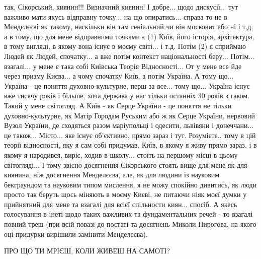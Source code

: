  так, Сікорський, киянин!!! Визначний киянин! І добре... щодо дискусії... тут
важливо мати якусь відправну точку... на що опиратись... справа то не в
Мєндєлєєві як такому, наскільки він там геніальний чи він московит або ні і
т.д, а в тому, що для мене відправними точками є (1) Київ, його історія,
архітектура, в тому вигляді, в якому вона існує в моєму світі... і т.д. Потім
(2) я сприймаю Людей як Людей, спочатку... а вже потім контекст національності
беру... Потім... взагалі... у мене є така собі Київська Теорія Відносності...
От у мене все йде через призму Києва... а чому спочатку Київ, а потім Україна.
А тому що... Україна - це поняття духовно-культурне, перш за все... тому що...
Україна існує вже тисячу років і більше, хоча держава у нас тільки останніх 30
років з гаком. Такий у мене світогляд. А Київ - як Серце України - це поняття
не тільки духовно-культурне, як Матір Городам Руським або ж як Серце України,
нервовий Вузол України, де сходяться разом маріупольці і одесити, львівяни і
донеччани... це також... Місто... яке існує об'єктивно, прямо зараз і тут.
Розумієте.. тому в цій теорії відносності, яку я сам собі придумав, Київ, в
якому я живу прямо зараз, і в якому я народився, виріс, ходив в школу... стоїть
на першому місці в цьому світогляді... І тому звісно досягнення Сікорського
стоять вище для мене як для киянина, ніж досягнення Менделєєва, але, як для
людини із науковим бекграундом та науковим типом мислення, я не можу спокійно
дивитись, як люди просто так беруть щось міняють в моєму Києві, не питаючи ніяк
моєї думки у прийнятний для мене та взагалі для всієї спільности киян...
спосіб. А якесь голосування в інеті щодо таких важливих та фундаментальних
речей - то взагалі повний треш (при всій повазі до постаті та досягнень Миколи
Пирогова, на якого оці придурки вирішили замінити Менделеєва).

ПРО ЩО ТИ МРІЄШ, КОЛИ ЖИВЕШ НА САМОТІ?
